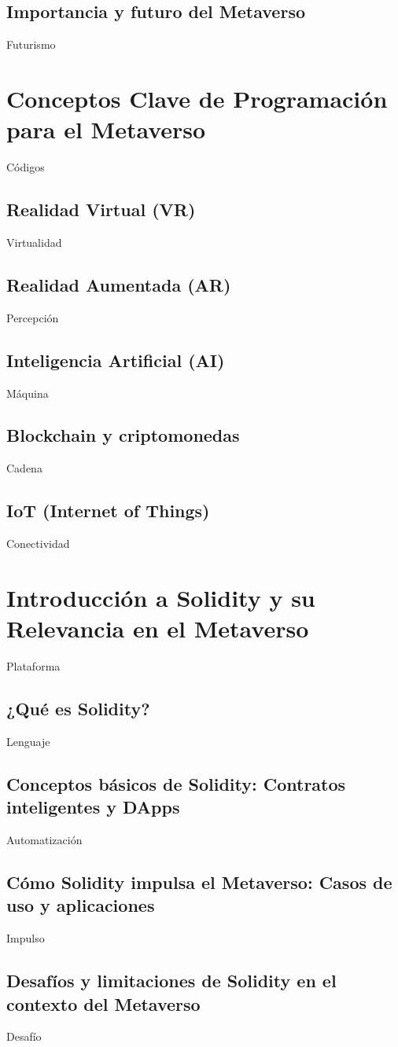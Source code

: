 \documentclass[a4paper,10pt]{article}
\begin{document}
	\subsection{Importancia y futuro del Metaverso}
	Futurismo
	
	\section{Conceptos Clave de Programación para el Metaverso}
	Códigos
	\subsection{Realidad Virtual (VR)}
	Virtualidad
	\subsection{Realidad Aumentada (AR)}
	Percepción
	\subsection{Inteligencia Artificial (AI)}
	Máquina
	\subsection{Blockchain y criptomonedas}
	Cadena
	\subsection{IoT (Internet of Things)}
	Conectividad
	
	\section{Introducción a Solidity y su Relevancia en el Metaverso}
	Plataforma
	\subsection{¿Qué es Solidity?}
	Lenguaje
	\subsection{Conceptos básicos de Solidity: Contratos inteligentes y DApps}
	Automatización
	\subsection{Cómo Solidity impulsa el Metaverso: Casos de uso y aplicaciones}
	Impulso
	\subsection{Desafíos y limitaciones de Solidity en el contexto del Metaverso}
	Desafío
\end{document}
